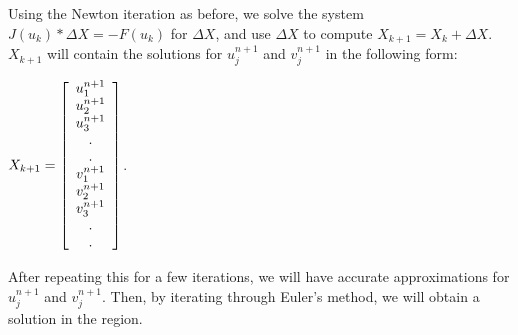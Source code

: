 \documentclass[11pt]{article}
\begin{document}
Using the Newton iteration as before, we solve the system $J(u_{k})*\Delta X = -F(u_{k})$ for $\Delta X$, and use $\Delta X$ to compute $X_{k+1} = X_{k} + \Delta X$. $X_{k+1}$ will contain the solutions for $u^{n+1}_{j}$ and $v^{n+1}_{j}$ in the following form:

$X_{k+1} = 
\left[ {\begin{array}{*{20}c}
   u^{n+1}_{1} \\
   u^{n+1}_{2} \\
   u^{n+1}_{3} \\
   . \\
   . \\
   v^{n+1}_{1} \\
   v^{n+1}_{2} \\
   v^{n+1}_{3} \\
   . \\
   . \\
 \end{array} } \right]
$.

After repeating this for a few iterations, we will have accurate approximations for $u^{n+1}_{j}$ and $v^{n+1}_{j}$. Then, by iterating through Euler's method, we will obtain a solution in the region.
\end{document}
